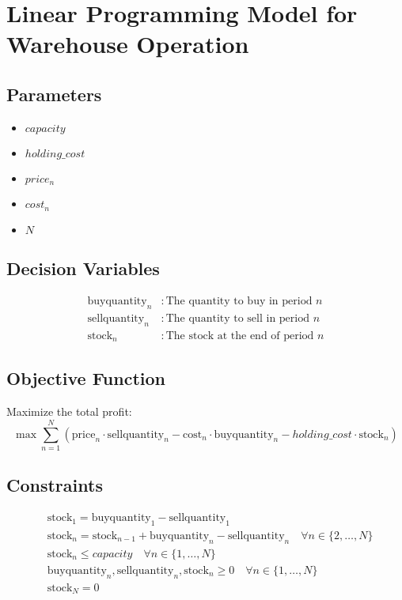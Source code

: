 \documentclass{article}
\begin{document}
\section*{Linear Programming Model for Warehouse Operation}

\subsection*{Parameters}
\begin{itemize}
    \item {} $capacity$
    \item {} $holding\_cost$
    \item {} $price_n$
    \item {} $cost_n$
    \item {} $N$
\end{itemize}

\subsection*{Decision Variables}
\begin{align*}
    \text{buyquantity}_n &: \text{The quantity to buy in period } n \\
    \text{sellquantity}_n &: \text{The quantity to sell in period } n \\
    \text{stock}_n &: \text{The stock at the end of period } n
\end{align*}

\subsection*{Objective Function}
Maximize the total profit:
\[
\max \sum_{n=1}^{N} \left( \text{price}_n \cdot \text{sellquantity}_n - \text{cost}_n \cdot \text{buyquantity}_n - holding\_cost \cdot \text{stock}_n \right)
\]

\subsection*{Constraints}
\begin{align*}
    & \text{stock}_1 = \text{buyquantity}_1 - \text{sellquantity}_1 \\
    & \text{stock}_n = \text{stock}_{n-1} + \text{buyquantity}_n - \text{sellquantity}_n \quad \forall n \in \{2, \ldots, N\} \\
    & \text{stock}_n \leq capacity \quad \forall n \in \{1, \ldots, N\} \\
    & \text{buyquantity}_n, \text{sellquantity}_n, \text{stock}_n \geq 0 \quad \forall n \in \{1, \ldots, N\} \\
    & \text{stock}_N = 0 
\end{align*}
\end{document}
